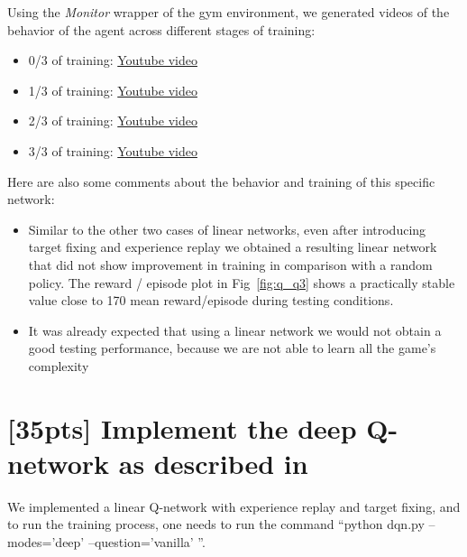 \documentclass{article}
\begin{document}
Using the \textit{Monitor} wrapper of the gym environment, we generated videos of the behavior of the agent across different stages of training:

\begin{itemize}
  \item 0/3 of training: \href{https://youtu.be/dXuBxXwdYLI}{Youtube video}
  \item 1/3 of training: \href{https://youtu.be/TShwk_6CKaQ}{Youtube video}
  \item 2/3 of training: \href{https://youtu.be/Ii8oEaGhTCs}{Youtube video}
  \item 3/3 of training: \href{https://youtu.be/7BcIHBRCN1I}{Youtube video}
\end{itemize}

Here are also some comments about the behavior and training of this specific network:

\begin{itemize}
  \item Similar to the other two cases of linear networks, even after introducing target fixing and experience replay we obtained a resulting linear network that did not show improvement in training in comparison with a random policy. The reward / episode plot in Fig~\ref{fig:q_q3} shows a practically stable value close to 170 mean reward/episode during testing conditions.
  \item It was already expected that using a linear network we would not obtain a good testing performance, because we are not able to learn all the game's complexity
\end{itemize}

\section{[35pts] Implement the deep Q-network as described in \cite{mnih2013playing,mnih2015human}}

We implemented a linear Q-network with experience replay and target fixing, and to run the training process, one needs to run the command ``python dqn.py --modes='deep' --question='vanilla' ''.
\end{document}
